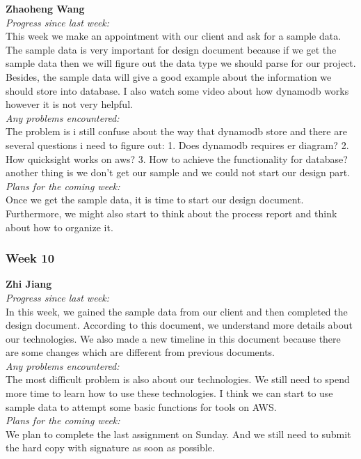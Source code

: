 \noindent\textbf{Zhaoheng Wang}\\
\noindent\textit{Progress since last week:}\\
This week we make an appointment with our client and ask for a sample data. The sample data is very important for design document because if we get the sample data then we will figure out the data type we should parse for our project. Besides, the sample data will give a good example about the information we should store into database. I also watch some video about how dynamodb works however it is not very helpful.\\

\noindent\textit{Any problems encountered:}\\
The problem is i still confuse about the way that dynamodb store and there are several questions i need to figure out: 1. Does dynamodb requires er diagram? 2. How quicksight works on aws? 3. How to achieve the functionality for database? another thing is we don't get our sample and we could not start our design part.\\

\noindent\textit{Plans for the coming week:}\\
Once we get the sample data, it is time to start our design document. Furthermore, we might also start to think about the process report and think about how to organize it.

\subsubsection{Week 10}
\textbf{Zhi Jiang}\\
\noindent\textit{Progress since last week:}\\
In this week, we gained the sample data from our client and then completed the design document. According to this document, we understand more details about our technologies. We also made a new timeline in this document because there are some changes which are different from previous documents.\\

\noindent\textit{Any problems encountered:}\\
The most difficult problem is also about our technologies. We still need to spend more time to learn how to use these technologies. I think we can start to use sample data to attempt some basic functions for tools on AWS.\\

\noindent\textit{Plans for the coming week:}\\
We plan to complete the last assignment on Sunday. And we still need to submit the hard copy with signature as soon as possible.\\ 

